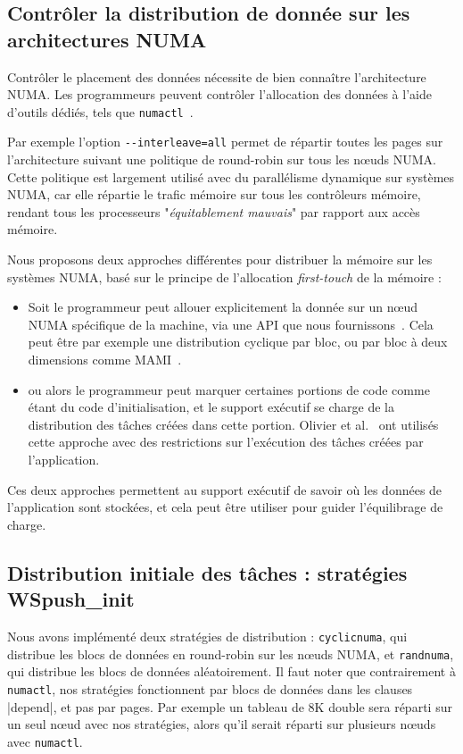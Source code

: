 \documentclass[parallelisme]{compas2016}
\begin{document}
\subsection{Contrôler la distribution de donnée sur les architectures NUMA}

Contrôler le placement des données nécessite de bien connaître l'architecture NUMA.
Les programmeurs peuvent contrôler l'allocation des données à l'aide d'outils
dédiés, tels que \verb/numactl/~\cite{DBLP:journals/corr/abs-1101-0093}.

Par exemple l'option \verb/--interleave=all/ permet de répartir toutes les pages
sur l'architecture suivant une politique de round-robin sur tous les nœuds NUMA.
Cette politique est largement utilisé avec du parallélisme dynamique sur systèmes
NUMA, car elle répartie le trafic mémoire sur tous les contrôleurs mémoire, rendant
tous les processeurs "\emph{équitablement mauvais}" par rapport aux accès mémoire.

Nous proposons deux approches différentes pour distribuer la mémoire sur les systèmes
NUMA, basé sur le principe de l'allocation \emph{first-touch} de la mémoire :
\begin{itemize}
  \item Soit le programmeur peut allouer explicitement la donnée sur un nœud NUMA
    spécifique de la machine, via une API que nous fournissons~\cite{Durand2013}.
    Cela peut être par exemple une distribution cyclique par bloc, ou par bloc à
    deux dimensions comme MAMI~\cite{BroFurGogWacNam10IJPP}.
  \item ou alors le programmeur peut marquer certaines portions de code comme
    étant du code d'initialisation, et le support exécutif se charge de la distribution
    des tâches créées dans cette portion.
    Olivier et al.~\cite{Olivier:2012:CMW:2388996.2389085} ont utilisés cette
    approche avec des restrictions sur l'exécution des tâches créées par l'application.
\end{itemize}

Ces deux approches permettent au support exécutif de savoir où les données
de l'application sont stockées, et cela peut être utiliser pour guider l'équilibrage de charge.

\subsection{Distribution initiale des tâches : stratégies WSpush\_init}

Nous avons implémenté deux stratégies de distribution : \verb/cyclicnuma/, qui
distribue les blocs de données en round-robin sur les nœuds NUMA, et \verb/randnuma/,
qui distribue les blocs de données aléatoirement.
Il faut noter que contrairement à \verb/numactl/, nos stratégies fonctionnent
par blocs de données dans les clauses |depend|, et pas par pages.
Par exemple un tableau de 8K double sera réparti sur un seul nœud avec nos
stratégies, alors qu'il serait réparti sur plusieurs nœuds avec \verb/numactl/.
\end{document}

